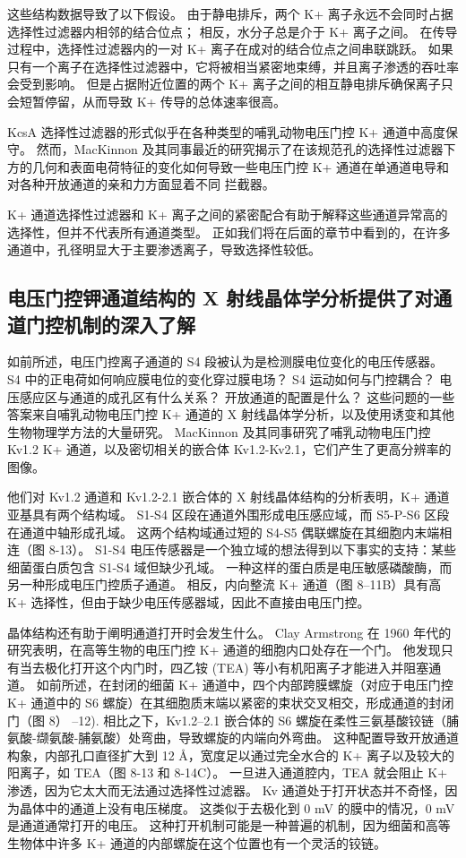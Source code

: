 这些结构数据导致了以下假设。 
由于静电排斥，两个 K+ 离子永远不会同时占据选择性过滤器内相邻的结合位点； 
相反，水分子总是介于 K+ 离子之间。 
在传导过程中，选择性过滤器内的一对 K+ 离子在成对的结合位点之间串联跳跃。 
如果只有一个离子在选择性过滤器中，它将被相当紧密地束缚，并且离子渗透的吞吐率会受到影响。 
但是占据附近位置的两个 K+ 离子之间的相互静电排斥确保离子只会短暂停留，从而导致 K+ 传导的总体速率很高。


KcsA 选择性过滤器的形式似乎在各种类型的哺乳动物电压门控 K+ 通道中高度保守。 
然而，MacKinnon 及其同事最近的研究揭示了在该规范孔的选择性过滤器下方的几何和表面电荷特征的变化如何导致一些电压门控 K+ 通道在单通道电导和对各种开放通道的亲和力方面显着不同 拦截器。


K+ 通道选择性过滤器和 K+ 离子之间的紧密配合有助于解释这些通道异常高的选择性，但并不代表所有通道类型。 
正如我们将在后面的章节中看到的，在许多通道中，孔径明显大于主要渗透离子，导致选择性较低。





\subsection{电压门控钾通道结构的 X 射线晶体学分析提供了对通道门控机制的深入了解}

如前所述，电压门控离子通道的 S4 段被认为是检测膜电位变化的电压传感器。 
S4 中的正电荷如何响应膜电位的变化穿过膜电场？ 
S4 运动如何与门控耦合？ 
电压感应区与通道的成孔区有什么关系？ 
开放通道的配置是什么？ 
这些问题的一些答案来自哺乳动物电压门控 K+ 通道的 X 射线晶体学分析，以及使用诱变和其他生物物理学方法的大量研究。 
MacKinnon 及其同事研究了哺乳动物电压门控 Kv1.2 K+ 通道，以及密切相关的嵌合体 Kv1.2-Kv2.1，它们产生了更高分辨率的图像。


他们对 Kv1.2 通道和 Kv1.2-2.1 嵌合体的 X 射线晶体结构的分析表明，K+ 通道亚基具有两个结构域。 
S1-S4 区段在通道外围形成电压感应域，而 S5-P-S6 区段在通道中轴形成孔域。 
这两个结构域通过短的 S4-S5 偶联螺旋在其细胞内末端相连（图 8-13）。 
S1-S4 电压传感器是一个独立域的想法得到以下事实的支持：某些细菌蛋白质包含 S1-S4 域但缺少孔域。 
一种这样的蛋白质是电压敏感磷酸酶，而另一种形成电压门控质子通道。 
相反，内向整流 K+ 通道（图 8–11B）具有高 K+ 选择性，但由于缺少电压传感器域，因此不直接由电压门控。


晶体结构还有助于阐明通道打开时会发生什么。 
Clay Armstrong 在 1960 年代的研究表明，在高等生物的电压门控 K+ 通道的细胞内口处存在一个门。 
他发现只有当去极化打开这个内门时，四乙铵 (TEA) 等小有机阳离子才能进入并阻塞通道。 
如前所述，在封闭的细菌 K+ 通道中，四个内部跨膜螺旋（对应于电压门控 K+ 通道中的 S6 螺旋）在其细胞质末端以紧密的束状交叉相交，形成通道的封闭门（图 8） –12). 相比之下，Kv1.2–2.1 嵌合体的 S6 螺旋在柔性三氨基酸铰链（脯氨酸-缬氨酸-脯氨酸）处弯曲，导致螺旋的内端向外弯曲。 
这种配置导致开放通道构象，内部孔口直径扩大到 12 Å，宽度足以通过完全水合的 K+ 离子以及较大的阳离子，如 TEA（图 8-13 和 8-14C）。 
一旦进入通道腔内，TEA 就会阻止 K+ 渗透，因为它太大而无法通过选择性过滤器。 
Kv 通道处于打开状态并不奇怪，因为晶体中的通道上没有电压梯度。 
这类似于去极化到 0 mV 的膜中的情况，0 mV 是通道通常打开的电压。 
这种打开机制可能是一种普遍的机制，因为细菌和高等生物体中许多 K+ 通道的内部螺旋在这个位置也有一个灵活的铰链。


